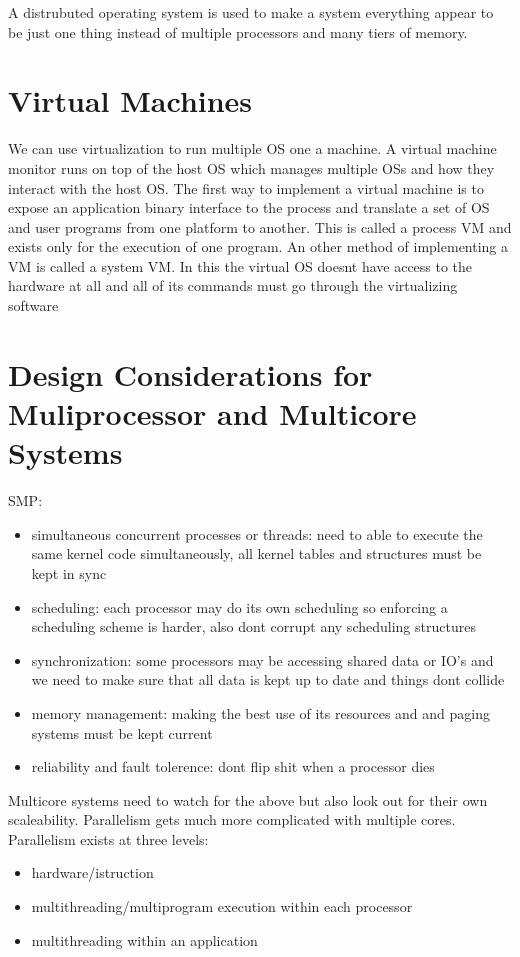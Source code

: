 \documentclass[12pt]{article}
\begin{document}
A distrubuted operating system is used to make a system everything appear to be just one thing instead of multiple processors and many tiers of memory.

\section{Virtual Machines}
We can use virtualization to run multiple OS one a machine. A virtual machine monitor runs on top of the host OS which manages multiple OSs and how they interact with the host OS. The first way to implement a virtual machine is to expose an application binary interface to the process and translate a set of OS and user programs from one platform to another. This is called a process VM and exists only for the execution of one program. An other method of implementing a VM is called a system VM. In this the virtual OS doesnt have access to the hardware at all and all of its commands must go through the virtualizing software

\section{Design Considerations for Muliprocessor and Multicore Systems}
SMP:
\begin{itemize}
    \item simultaneous concurrent processes or threads: need to able to execute the same kernel code simultaneously, all kernel tables and structures must be kept in sync
    \item scheduling: each processor may do its own scheduling so enforcing a scheduling scheme is harder, also dont corrupt any scheduling structures
    \item synchronization: some processors may be accessing shared data or IO's and we need to make sure that all data is kept up to date and things dont collide
    \item memory management: making the best use of its resources and and paging systems must be kept current
    \item reliability and fault tolerence: dont flip shit when a processor dies
\end{itemize}

Multicore systems need to watch for the above but also look out for their own scaleability. Parallelism gets much more complicated with multiple cores. Parallelism exists at three levels:
\begin{itemize}
    \item hardware/istruction
    \item multithreading/multiprogram execution within each processor
    \item multithreading within an application
\end{itemize}
\end{document}

